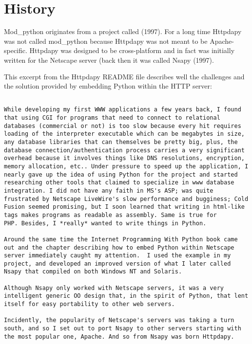 \begin{seealso}
\end{seealso}

\section{History\label{intr-history}}

  Mod_python originates from a project called
  (1997). For a long time Httpdapy was not called mod_python because
  Httpdapy was not meant to be Apache-specific. Httpdapy was designed
  to be cross-platform and in fact was initially written for the
  Netscape server (back then it was called Nsapy (1997).

  This excerpt from the Httpdapy README file describes well the
  challenges and the solution provided by embedding Python within the
  HTTP server:

\begin{verbatim}

While developing my first WWW applications a few years back, I found
that using CGI for programs that need to connect to relational
databases (commercial or not) is too slow because every hit requires
loading of the interpreter executable which can be megabytes in size,
any database libraries that can themselves be pretty big, plus, the
database connection/authentication process carries a very significant
overhead because it involves things like DNS resolutions, encryption,
memory allocation, etc.. Under pressure to speed up the application, I
nearly gave up the idea of using Python for the project and started
researching other tools that claimed to specialize in www database
integration. I did not have any faith in MS's ASP; was quite
frustrated by Netscape LiveWire's slow performance and bugginess; Cold
Fusion seemed promising, but I soon learned that writing in html-like
tags makes programs as readable as assembly. Same is true for
PHP. Besides, I *really* wanted to write things in Python.

Around the same time the Internet Programming With Python book came
out and the chapter describing how to embed Python within Netscape
server immediately caught my attention.  I used the example in my
project, and developed an improved version of what I later called
Nsapy that compiled on both Windows NT and Solaris.

Although Nsapy only worked with Netscape servers, it was a very
intelligent generic OO design that, in the spirit of Python, that lent
itself for easy portability to other web servers.

Incidently, the popularity of Netscape's servers was taking a turn
south, and so I set out to port Nsapy to other servers starting with
the most popular one, Apache. And so from Nsapy was born Httpdapy.

\end{verbatim}


